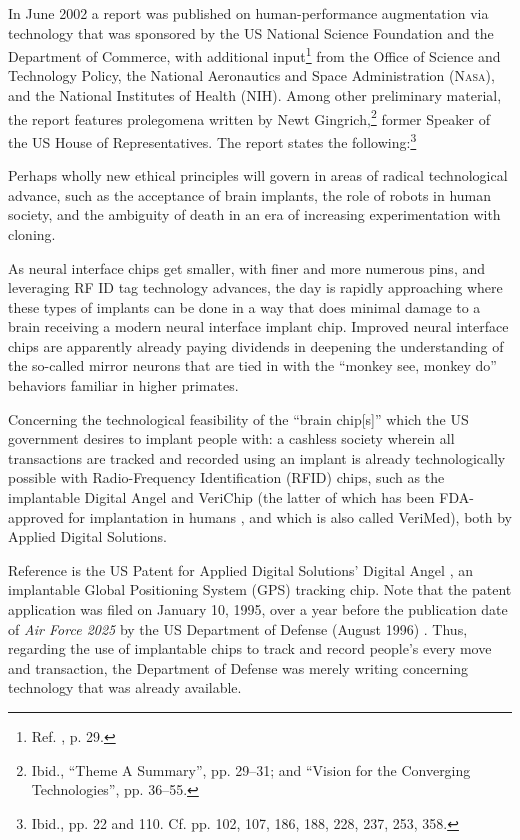 \documentclass[letterpaper,12pt]{article}
\newenvironment{squote}
  {\small\quote}
  {\endquote\normalsize}
\begin{document}
In June 2002 a report was published on human-performance augmentation via technology that was sponsored by the US National Science Foundation and the Department of Commerce, with additional input\footnote{Ref. , p. 29.} from the Office of Science and Technology Policy, the National Aeronautics and Space Administration (\textsc{Nasa}), and the National Institutes of Health (NIH). Among other preliminary material, the report features prolegomena written by Newt Gingrich,\footnote{Ibid., ``Theme A Summary'', pp. 29--31; and ``Vision for the Converging Technologies'', pp. 36--55.} former Speaker of the US House of Representatives. The report states the following:\footnote{Ibid., pp. 22 and 110. Cf. pp. 102, 107, 186, 188, 228, 237, 253, 358.}

\begin{squote}
Perhaps wholly new ethical principles will govern in areas of radical technological advance, such as the acceptance of brain implants, the role of robots in human society, and the ambiguity of death in an era of increasing experimentation with cloning.
\end{squote}

\begin{squote}
As neural interface chips get smaller, with finer and more numerous pins, and leveraging RF ID tag technology advances, the day is rapidly approaching where these types of implants can be done in a way that does minimal damage to a brain receiving a modern neural interface implant chip. Improved neural interface chips are apparently already paying dividends in deepening the understanding of the so-called mirror neurons that are tied in with the ``monkey see, monkey do'' behaviors familiar in higher primates.
\end{squote}

Concerning the technological feasibility of the ``brain chip[s]'' which the US government desires to implant people with: a cashless society wherein all transactions are tracked and recorded using an implant is already technologically possible with Radio-Frequency Identification (RFID) chips, such as the implantable Digital Angel and VeriChip (the latter of which has been FDA-approved for implantation in humans \cite{FederalRegister2004}, and which is also called VeriMed), both by Applied Digital Solutions.

Reference  is the US Patent for Applied Digital Solutions' Digital Angel \cite{BusinessWire1999}, an implantable Global Positioning System (GPS) tracking chip. Note that the patent application was filed on January 10, 1995, over a year before the publication date of \emph{Air Force 2025} by the US Department of Defense (August 1996) \cite{OsborneEtAl1996}. Thus, regarding the use of implantable chips to track and record people's every move and transaction, the Department of Defense was merely writing concerning technology that was already available.
\end{document}

